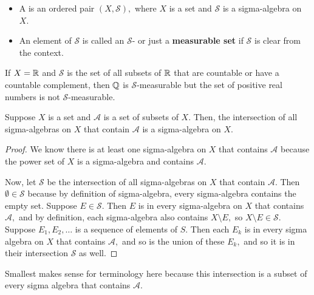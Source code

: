 \documentclass{article}
\begin{document}
\begin{definition}
	\begin{itemize}
		\item A  is an \@{ordered pair} $(X, \mathcal{S}),$ where $X$ is a \@{set} and $\mathcal{S}$ is a \@{sigma-algebra} on $X.$
		\item An \@{element} of $\mathcal{S}$ is called an $\mathcal{S}$- or just a \textbf{measurable set} if $\mathcal{S}$ is clear from the context.
	\end{itemize}
\end{definition}
\begin{example}
	If $X = \mathbb{R}$ and $\mathcal{S}$ is the \@{set} of all \@{subsets} of $\mathbb{R}$ that are \@{countable} or have a \@{countable} \@{complement}, then $\mathbb{Q}$ is $\mathcal{S}$-measurable but the set of positive real numbers is not $\mathcal{S}$-\@{measurable}.
\end{example}

\begin{theorem}
	Suppose $X$ is a \@{set} and $\mathcal{A}$ is a set of \@{subsets} of $X.$ Then, the \@{intersection} of all \@{sigma-algebras} on $X$ that contain $\mathcal{A}$ is a \@{sigma-algebra} on $X.$
\end{theorem}
\begin{proof}
	We know there is at least one \@{sigma-algebra} on $X$ that contains $\mathcal{A}$ because the \@{power set} of $X$ is a \@{sigma}-algebra and contains $\mathcal{A}.$

	Now, let $\mathcal{S}$ be the \@{intersection} of all \@{sigma-algebras} on $X$ that contain $\mathcal{A}.$ Then $\emptyset \in \mathcal{S}$ because by definition of \@{sigma-algebra}, every \@{sigma-algebra} contains the empty set.
	Suppose $E \in \mathcal{S}.$ Then $E$ is in every \@{sigma-algebra} on $X$ that contains $\mathcal{A},$ and by definition, each \@{sigma-algebra} also contains $X \setminus E,$ so $X \setminus E \in \mathcal{S}.$
	Suppose $E_1, E_2, \dots$ is a \@{sequence} of \@{elements} of $S.$ Then each $E_k$ is in every \@{sigma algebra} on $X$ that contains $\mathcal{A},$ and so is the \@{union} of these $E_k,$ and so it is in their intersection $\mathcal{S}$ as well.
\end{proof}
\begin{note}
	Smallest makes sense for terminology here because this intersection is a subset of every \@{sigma algebra} that contains $\mathcal{A}.$
\end{note}
\end{document}
